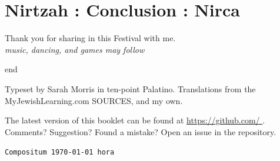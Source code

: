 \documentclass[a5paper,10pt]{memoir}
\begin{document}
\section{Nirtzah : Conclusion : Nirca}
\Nirtzah
% 
Thank you for sharing in this Festival with me.\\
\textit{music, dancing, and games may follow}
\begin{center}
	{end}
\end{center}

\ChadGayahText

\vfill
%
Typeset by Sarah Morris in ten-point Palatino.  Translations from the
MyJewishLearning.com SOURCES, and my own.

% 
The latest version of this booklet can be found at
\url{ https://github.com/ }. Comments?
Suggestion? Found a mistake? Open an issue in the repository.
% 

{\centering\footnotesize\texttt{Compositum \today\ hora \currenttime}\par}
\end{document}
